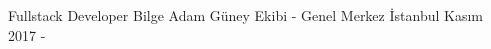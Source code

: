 \begin{cventries}
{\begin{cvitems}
    \cventry
        {Fullstack Developer}
        {Bilge Adam Güney Ekibi - Genel Merkez}
        {İstanbul}
        {Kasım 2017 - }
        {
            \begin{cvitems}
               \item { } 
            \end{cvitems}
        }
        
            \end{cvitems}
        }
\end{cventries}
